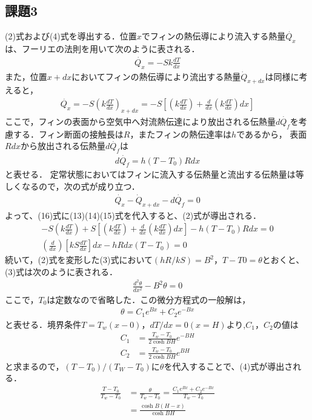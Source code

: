 \documentclass[a4paper,11pt,uplatex]{jsarticle}
\begin{document}
\subsection{課題3}
(2)式および(4)式を導出する．位置$x$でフィンの熱伝導により流入する熱量$\dot{Q_x}$は、フーリエの法則を用いて次のように表される．
\begin{align}
  \dot{Q_x}=-Sk \frac{dT}{dx}
\end{align}
また，位置$x+dx$においてフィンの熱伝導により流出する熱量$\dot{Q}_{x+dx}$は同様に考えると，
\begin{align}
  \dot{Q_x}=-S \left(k \frac{dT}{dx}\right)_{x+dx} = -S\left[ \left(k \frac{dT}{dx} \right) + \frac{d}{dx} \left(k \frac{dT}{dx}\right)dx \right]
\end{align}
ここで，フィンの表面から空気中へ対流熱伝達により放出される伝熱量$d \dot{Q_f}$を考慮する．フィン断面の接触長は$R$，またフィンの熱伝達率は$h$であるから，
表面$Rdx$から放出される伝熱量$d \dot{Q_f}$は
\begin{align}
  d \dot{Q_f}= h(T-T_0)Rdx
\end{align}
と表せる．
定常状態においてはフィンに流入する伝熱量と流出する伝熱量は等しくなるので，次の式が成り立つ．
\begin{align}
  \dot{Q_x}-\dot{Q}_{x+dx}-d \dot{Q_f}=0
\end{align}
よって、(16)式に(13)(14)(15)式を代入すると、(2)式が導出される．
\begin{align}
  -S\left(k \frac{dT}{dx} \right) +S\left[ \left(k \frac{dT}{dx} \right) + \frac{d}{dx} \left(k \frac{dT}{dx}\right)dx \right] -h(T-T_0)Rdx =0 \\
  \left( \frac{d}{dx}\right) \left[ kS \frac{dT}{dx} \right]dx -hRdx(T-T_0) =0
\end{align}
続いて，(2)式を変形した(3)式において$(hR/kS) =B^2，T−T0=\theta$とおくと、(3)式は次のように表される．
\begin{align}
  \frac{d^2\theta}{dx^2} - B^2\theta =0
\end{align}
ここで，$T_0$は定数なので省略した．この微分方程式の一般解は，
\begin{align}
  \theta = C_1 e^{Bx} + C_2 e^{-Bx}
\end{align}
と表せる．境界条件$T=T_{w}(x−0)，dT/dx=0(x=H)$より,$C_1$，$C_2$の値は
\begin{align}
  C_1 &= \frac{T_w - T_0}{2\cosh BH} e^{-BH} \\
  C_2 &= \frac{T_w - T_0}{2\cosh BH} e^{BH}
\end{align}
と求まるので，$(T−T_0)/(T_W−T_0)$に$\theta$を代入することで、(4)式が導出される．
\begin{align}
  \frac{T-T_0}{T_w-T_0} &= \frac{\theta}{T_w-T_0} = \frac{C_1e^{Bx} + C_2e^{-Bx}}{T_w-T_0} \\
  &= \frac{\cosh B(H-x)}{\cosh BH}
\end{align}
\end{document}
